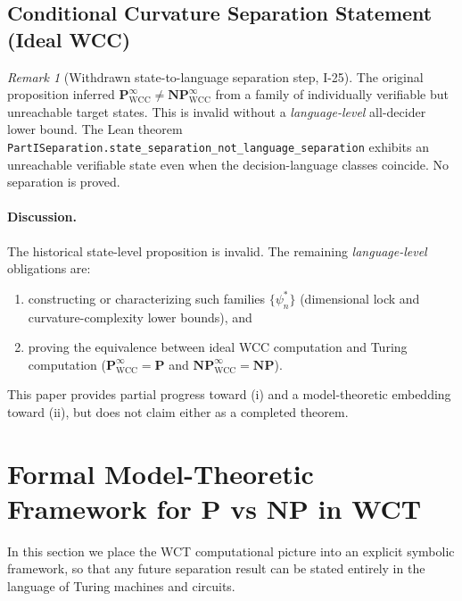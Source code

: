\documentclass[12pt]{article}
\theoremstyle{remark}
\newtheorem*{remark}{Remark}
\begin{document}
\subsection{Conditional Curvature Separation Statement (Ideal WCC)}

\begin{remark}[Withdrawn state-to-language separation step, I-25]
The original proposition inferred
$\mathbf P_{\mathrm{WCC}}^\infty\ne\mathbf{NP}_{\mathrm{WCC}}^\infty$
from a family of individually verifiable but unreachable target
states.  This is invalid without a \emph{language-level}
all-decider lower bound.  The Lean theorem
\nolinkurl{PartISeparation.state_separation_not_language_separation}
exhibits an unreachable verifiable state even when the
decision-language classes coincide.  No separation is proved.
\end{remark}

\paragraph{Discussion.}
The historical state-level proposition is invalid. The
remaining \emph{language-level} obligations are:
\begin{enumerate}
  \item constructing or characterizing such families $\{\psi^*_n\}$ (dimensional lock and curvature-complexity lower bounds), and  
  \item proving the equivalence between ideal WCC computation and Turing computation
        ($\mathbf{P}_{\mathrm{WCC}}^{\infty} = \mathbf{P}$ and
         $\mathbf{NP}_{\mathrm{WCC}}^{\infty} = \mathbf{NP}$).
\end{enumerate}
This paper provides partial progress toward (i) and a model-theoretic embedding
toward (ii), but does not claim either as a completed theorem.







\clearpage
\section{Formal Model-Theoretic Framework for \textbf{P} vs \textbf{NP} in WCT}
\label{sec:model-theoretic}

In this section we place the WCT computational picture into an explicit symbolic framework, so that any future separation result can be stated entirely in the language of Turing machines and circuits.
\end{document}
